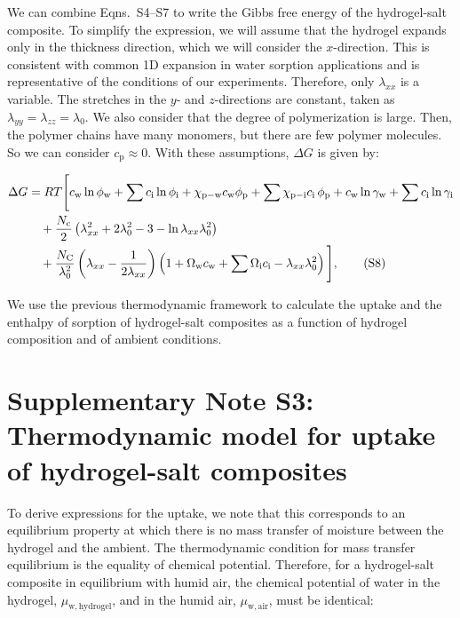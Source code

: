 \documentclass[11pt]{article}
\begin{document}
We can combine Eqns.~S4--S7 to write the Gibbs free energy of the hydrogel-salt composite. To simplify the expression, we will assume that the hydrogel expands only in the thickness direction, which we will consider the $x$-direction. This is consistent with common 1D expansion in water sorption applications\cite{li2020} and is representative of the conditions of our experiments. Therefore, only $\lambda_{xx}$ is a variable. The stretches in the $y$- and $z$-directions are constant, taken as $\lambda_{yy} = \lambda_{zz} = \lambda_0$. We also consider that the degree of polymerization is large. Then, the polymer chains have many monomers, but there are few polymer molecules. So we can consider $c_\mathrm{p} \approx 0$. With these assumptions, $\Delta G$ is given by:

\begin{align}
\Delta G &= RT\Bigg[c_\mathrm{w} \ln \phi_\mathrm{w} + \sum c_\mathrm{i} \ln \phi_\mathrm{i} + \chi_\mathrm{p-w} c_\mathrm{w} \phi_\mathrm{p} + \sum \chi_\mathrm{p-i} c_\mathrm{i}\, \phi_\mathrm{p} + c_\mathrm{w} \ln \gamma_\mathrm{w} + \sum c_\mathrm{i} \ln \gamma_\mathrm{i} \notag\\
&\quad + \frac{N_\mathrm{c}}{2}\left(\lambda_{xx}^2 + 2\lambda_0^2 - 3 - \ln \lambda_{xx}\lambda_0^2\right) \notag\\
&\quad + \frac{N_\mathrm{C}}{\lambda_0^2}\left(\lambda_{xx} - \frac{1}{2\lambda_{xx}}\right)\left(1 + \Omega_\mathrm{w} c_\mathrm{w} + \sum \Omega_\mathrm{i} c_\mathrm{i} - \lambda_{xx}\lambda_0^2\right)\Bigg], \tag{S8}
\end{align}

We use the previous thermodynamic framework to calculate the uptake and the enthalpy of sorption of hydrogel-salt composites as a function of hydrogel composition and of ambient conditions.

\clearpage

\section*{Supplementary Note S3: Thermodynamic model for uptake of hydrogel-salt composites}

To derive expressions for the uptake, we note that this corresponds to an equilibrium property at which there is no mass transfer of moisture between the hydrogel and the ambient. The thermodynamic condition for mass transfer equilibrium is the equality of chemical potential.\cite{atkins2006} Therefore, for a hydrogel-salt composite in equilibrium with humid air, the chemical potential of water in the hydrogel, $\mu_\mathrm{w,hydrogel}$, and in the humid air, $\mu_\mathrm{w,air}$, must be identical:
\end{document}
